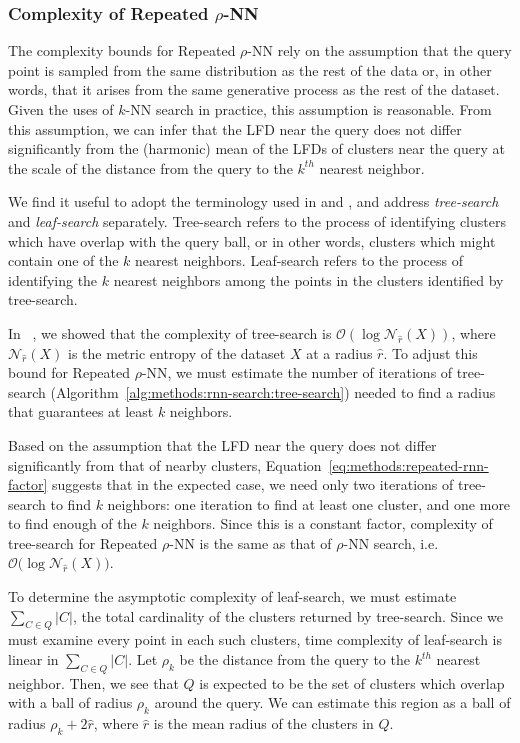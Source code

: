 \subsubsection{Complexity of Repeated \texorpdfstring{$\rho$}{p}-NN}
\label{sec:methods:knn-search:repeated-rnn-complexity}

The complexity bounds for Repeated $\rho$-NN rely on the assumption that the query point is sampled from the same distribution as the rest of the data or, in other words, that it arises from the same generative process as the rest of the dataset.
Given the uses of $k$-NN search in practice, this assumption is reasonable.
From this assumption, we can infer that the LFD near the query does not differ significantly from the (harmonic) mean of the LFDs of clusters near the query at the scale of the distance from the query to the $k^{th}$ nearest neighbor.

We find it useful to adopt the terminology used in \cite{ishaq2019clustered} and \cite{yu2015entropy}, and address \textit{tree-search} and \textit{leaf-search} separately.
Tree-search refers to the process of identifying clusters which have overlap with the query ball, or in other words, clusters which might contain one of the $k$ nearest neighbors.
Leaf-search refers to the process of identifying the $k$ nearest neighbors among the points in the clusters identified by tree-search.

In ~\cite{ishaq2019clustered}, we showed that the complexity of tree-search is $\mathcal{O}(\log\mathcal{N}_{\hat{r}}(X))$, where $\mathcal{N}_{\hat{r}}(X)$ is the metric entropy of the dataset $X$ at a radius $\hat{r}$.
To adjust this bound for Repeated $\rho$-NN, we must estimate the number of iterations of tree-search (Algorithm~\ref{alg:methods:rnn-search:tree-search}) needed to find a radius that guarantees at least $k$ neighbors.

Based on the assumption that the LFD near the query does not differ significantly from that of nearby clusters, Equation~\ref{eq:methods:repeated-rnn-factor} suggests that in the expected case, we need only two iterations of tree-search to find $k$ neighbors:
one iteration to find at least one cluster, and one more to find enough of the $k$ neighbors.
Since this is a constant factor, complexity of tree-search for Repeated $\rho$-NN is the same as that of $\rho$-NN search, i.e. $\mathcal{O}\big(\log\mathcal{N}_{\hat{r}}(X)\big)$.

To determine the asymptotic complexity of leaf-search, we must estimate $\sum_{C \in Q} |C|$, the total cardinality of the clusters returned by tree-search.
Since we must examine every point in each such clusters, time complexity of leaf-search is linear in $\sum_{C \in Q} |C|$.
Let $\rho_k$ be the distance from the query to the $k^{th}$ nearest neighbor.
Then, we see that $Q$ is expected to be the set of clusters which overlap with a ball of radius $\rho_k$ around the query.
We can estimate this region as a ball of radius $\rho_k + 2\hat{r}$, where $\hat{r}$ is the mean radius of the clusters in $Q$.


